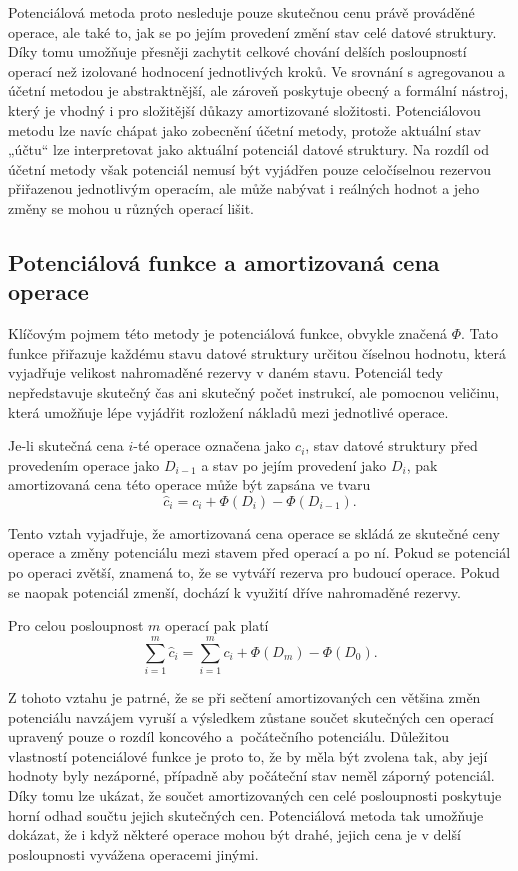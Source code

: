 Potenciálová metoda proto nesleduje pouze skutečnou cenu právě prováděné operace, ale také to, jak se po jejím provedení změní stav celé datové struktury. Díky tomu umožňuje přesněji zachytit celkové chování delších posloupností operací než izolované hodnocení jednotlivých kroků. Ve srovnání s agregovanou a účetní metodou je abstraktnější, ale zároveň poskytuje obecný a formální nástroj, který je vhodný i pro složitější důkazy amortizované složitosti. Potenciálovou metodu lze navíc chápat jako zobecnění účetní metody, protože aktuální stav „účtu“ lze interpretovat jako aktuální potenciál datové struktury. Na rozdíl od účetní metody však potenciál nemusí být vyjádřen pouze celočíselnou rezervou přiřazenou jednotlivým operacím, ale může nabývat i reálných hodnot a jeho změny se mohou u různých operací lišit.

\subsection{Potenciálová funkce a amortizovaná cena operace}
Klíčovým pojmem této metody je potenciálová funkce, obvykle značená \(\Phi\). Tato funkce přiřazuje každému stavu datové struktury určitou číselnou hodnotu, která vyjadřuje velikost nahromaděné rezervy v daném stavu. Potenciál tedy nepředstavuje skutečný čas ani skutečný počet instrukcí, ale pomocnou veličinu, která umožňuje lépe vyjádřit rozložení nákladů mezi jednotlivé operace.

Je-li skutečná cena \(i\)-té operace označena jako \(c_i\), stav datové struktury před provedením operace jako \(D_{i-1}\) a stav po jejím provedení jako \(D_i\), pak amortizovaná cena této operace může být zapsána ve tvaru \[\hat{c}_i = c_i + \Phi(D_i) - \Phi(D_{i-1}).\]

Tento vztah vyjadřuje, že amortizovaná cena operace se skládá ze skutečné ceny operace a změny potenciálu mezi stavem před operací a po ní. Pokud se potenciál po operaci zvětší, znamená to, že se vytváří rezerva pro budoucí operace. Pokud se naopak potenciál zmenší, dochází k využití dříve nahromaděné rezervy.

Pro celou posloupnost \(m\) operací pak platí \[\sum_{i=1}^{m} \hat{c}_i=\sum_{i=1}^{m} c_i + \Phi(D_m) - \Phi(D_0).\]

Z tohoto vztahu je patrné, že se při sečtení amortizovaných cen většina změn potenciálu navzájem vyruší a výsledkem zůstane součet skutečných cen operací upravený pouze o rozdíl koncového a~počátečního potenciálu. Důležitou vlastností potenciálové funkce je proto to, že by měla být zvolena tak, aby její hodnoty byly nezáporné, případně aby počáteční stav neměl záporný potenciál. Díky tomu lze ukázat, že součet amortizovaných cen celé posloupnosti poskytuje horní odhad součtu jejich skutečných cen. Potenciálová metoda tak umožňuje dokázat, že i když některé operace mohou být drahé, jejich cena je v delší posloupnosti vyvážena operacemi jinými.

